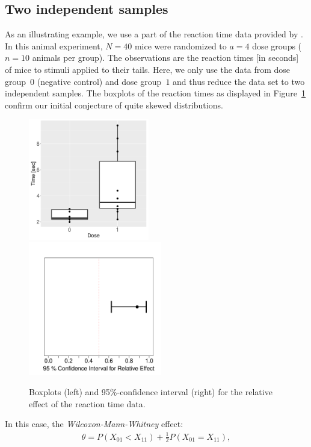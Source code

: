 \subsection{Two independent samples}

As an illustrating example, we use a part of the reaction time data provided by 
\cite{shirley1977non}. In this animal experiment, $N=40$ mice 
were randomized to $a=4$ dose groups ($n=10$ animals per group). The 
observations are the reaction times [in seconds] of mice to stimuli applied to 
their tails. Here, we only use the data from dose group~$0$ (negative control) 
and dose group~$1$ and thus reduce the data set to two independent samples. The 
boxplots of the reaction times as displayed in Figure~\ref{fig:reaction} 
confirm our initial conjecture of quite skewed distributions. 
\begin{figure}[t!]
\centering
\includegraphics[width=0.47\textwidth]{boxplot_reaction}
\includegraphics[width=0.52\textwidth]{CI_reaction}
\caption{\label{fig:reaction} Boxplots (left) and 95\%-confidence interval (right) for the relative effect of the reaction time data.}
\end{figure}
In this case, the \emph{Wilcoxon-Mann-Whitney} effect:
\begin{eqnarray*}
\theta=P(X_{01}< X_{11}) +\tfrac12 P(X_{01}=X_{11}),
\end{eqnarray*}
